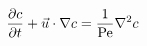 \documentclass[12pt]{article}
\begin{document}
\[
\frac{\partial c}{\partial t} + \vec{u} \cdot \nabla c = \frac{1}{\rm
  Pe} \nabla^2 c
\]
\end{document}
